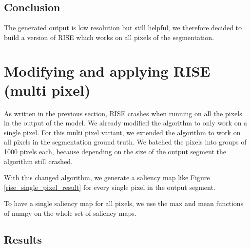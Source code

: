 \subsection{Conclusion}
The generated output is low resolution but still helpful, we therefore decided to build a version of RISE which works on all pixels of the segmentation.

\section{Modifying and applying RISE (multi pixel)}

As written in the previous section, RISE crashes when running on all the pixels in the output of the model. We already modified the algorithm to only work on a single pixel. For this multi pixel variant, we extended the algorithm to work on all pixels in the segmentation ground truth. We batched the pixels into groups of 1000 pixels each, because depending on the size of the output segment the algorithm still crashed.

With this changed algorithm, we generate a saliency map like Figure \ref{rise_single_pixel_result} for every single pixel in the output segment.

To have a single saliency map for all pixels, we use the max and mean functions of numpy on the whole set of saliency maps.

\subsection{Results}

